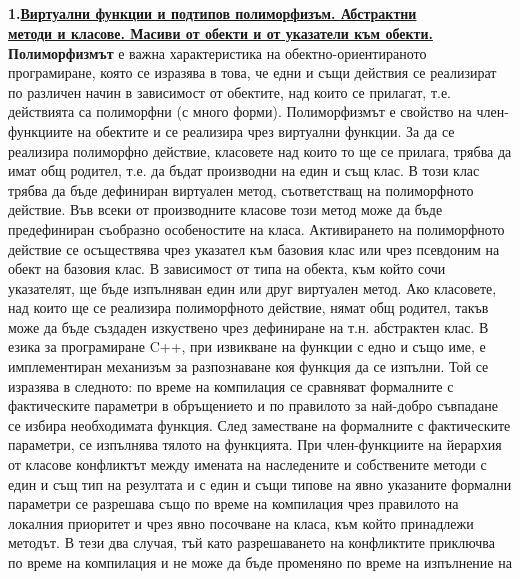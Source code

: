 \documentclass{article}
\begin{document}
\subsection*{\color{bordeaux}{17. ООП. Подтипов и параметричен полиморфизъм. Множествено наследяване.}}

\textbf{1.\underline{Виртуални функции и подтипов полиморфизъм. Абстрактни} \\ \underline{методи и класове. Масиви от обекти и от
указатели към обекти.}} \newline\newline
\textbf{Полиморфизмът} е важна характеристика на обектно-ориентираното програмиране, която се изразява в това, че едни и същи
действия се реализират по различен начин в зависимост от обектите, над които се прилагат, т.е. действията са полиморфни
(с много форми). Полиморфизмът е свойство на член-функциите на обектите и се реализира чрез виртуални функции. За да се реализира
полиморфно действие, класовете над които то ще се прилага, трябва да имат общ родител, т.е. да бъдат производни на един и същ
клас. В този клас трябва да бъде дефиниран виртуален метод, съответстващ на полиморфното действие. Във всеки от производните
класове този метод може да бъде предефиниран съобразно особеностите на класа. Активирането на полиморфното действие се осъществява
чрез указател към базовия клас или чрез псевдоним на обект на базовия клас. В зависимост от типа на обекта, към който сочи
указателят, ще бъде изпълняван един или друг виртуален метод. Ако класовете, над които ще се реализира полиморфното действие,
нямат общ родител, такъв може да бъде създаден изкуствено чрез дефиниране на т.н. абстрактен клас. \newline\newline
В езика за програмиране C++, при извикване на функции с едно и също име, е имплементиран механизъм за разпознаване коя функция
да се изпълни. Той се изразява в следното: по време на компилация се сравняват формалните с фактическите параметри в обръщението
и по правилото за най-добро съвпадане се избира необходимата функция. След заместване на формалните с фактическите параметри,
се изпълнява тялото на функцията. При член-функциите на йерархия от класове конфликтът между имената на наследените и собствените
методи с един и същ тип на резултата и с един и същи типове на явно указаните формални параметри се разрешава също по време на
компилация чрез правилото на локалния приоритет и чрез явно посочване на класа, към който принадлежи методът. В тези два случая,
тъй като разрешаването на конфликтите приключва по време на компилация и не може да бъде променяно по време на изпълнение на
\end{document}
